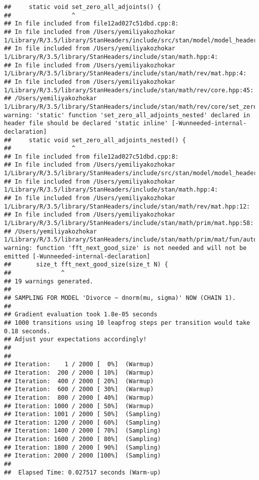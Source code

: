 \documentclass[]{article}
\begin{document}
\begin{verbatim}
##     static void set_zero_all_adjoints() {
##                 ^
## In file included from file12ad027c51dbd.cpp:8:
## In file included from /Users/yemiliyakozhokar 1/Library/R/3.5/library/StanHeaders/include/src/stan/model/model_header.hpp:4:
## In file included from /Users/yemiliyakozhokar 1/Library/R/3.5/library/StanHeaders/include/stan/math.hpp:4:
## In file included from /Users/yemiliyakozhokar 1/Library/R/3.5/library/StanHeaders/include/stan/math/rev/mat.hpp:4:
## In file included from /Users/yemiliyakozhokar 1/Library/R/3.5/library/StanHeaders/include/stan/math/rev/core.hpp:45:
## /Users/yemiliyakozhokar 1/Library/R/3.5/library/StanHeaders/include/stan/math/rev/core/set_zero_all_adjoints_nested.hpp:17:17: warning: 'static' function 'set_zero_all_adjoints_nested' declared in header file should be declared 'static inline' [-Wunneeded-internal-declaration]
##     static void set_zero_all_adjoints_nested() {
##                 ^
## In file included from file12ad027c51dbd.cpp:8:
## In file included from /Users/yemiliyakozhokar 1/Library/R/3.5/library/StanHeaders/include/src/stan/model/model_header.hpp:4:
## In file included from /Users/yemiliyakozhokar 1/Library/R/3.5/library/StanHeaders/include/stan/math.hpp:4:
## In file included from /Users/yemiliyakozhokar 1/Library/R/3.5/library/StanHeaders/include/stan/math/rev/mat.hpp:12:
## In file included from /Users/yemiliyakozhokar 1/Library/R/3.5/library/StanHeaders/include/stan/math/prim/mat.hpp:58:
## /Users/yemiliyakozhokar 1/Library/R/3.5/library/StanHeaders/include/stan/math/prim/mat/fun/autocorrelation.hpp:17:14: warning: function 'fft_next_good_size' is not needed and will not be emitted [-Wunneeded-internal-declaration]
##       size_t fft_next_good_size(size_t N) {
##              ^
## 19 warnings generated.
## 
## SAMPLING FOR MODEL 'Divorce ~ dnorm(mu, sigma)' NOW (CHAIN 1).
## 
## Gradient evaluation took 1.8e-05 seconds
## 1000 transitions using 10 leapfrog steps per transition would take 0.18 seconds.
## Adjust your expectations accordingly!
## 
## 
## Iteration:    1 / 2000 [  0%]  (Warmup)
## Iteration:  200 / 2000 [ 10%]  (Warmup)
## Iteration:  400 / 2000 [ 20%]  (Warmup)
## Iteration:  600 / 2000 [ 30%]  (Warmup)
## Iteration:  800 / 2000 [ 40%]  (Warmup)
## Iteration: 1000 / 2000 [ 50%]  (Warmup)
## Iteration: 1001 / 2000 [ 50%]  (Sampling)
## Iteration: 1200 / 2000 [ 60%]  (Sampling)
## Iteration: 1400 / 2000 [ 70%]  (Sampling)
## Iteration: 1600 / 2000 [ 80%]  (Sampling)
## Iteration: 1800 / 2000 [ 90%]  (Sampling)
## Iteration: 2000 / 2000 [100%]  (Sampling)
## 
##  Elapsed Time: 0.027517 seconds (Warm-up)

\end{verbatim}
\end{document}
